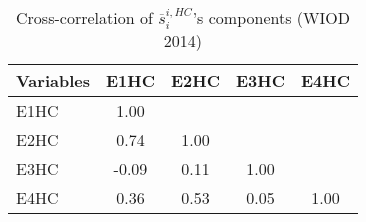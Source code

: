 \begin{table}[htbp]\centering \caption{Cross-correlation of $\overline{s}_{i}^{i,HC}$'s components (WIOD 2014)\label{table:corretable1}}
\begin{tabular}{l  c  c  c  c }\hline\hline
\multicolumn{1}{c}{Variables} &E1HC&E2HC&E3HC&E4HC\\ \hline
E1HC&1.00\\
E2HC&0.74&1.00\\
E3HC&-0.09&0.11&1.00\\
E4HC&0.36&0.53&0.05&1.00\\
\hline \hline 
 \end{tabular}
\end{table}

